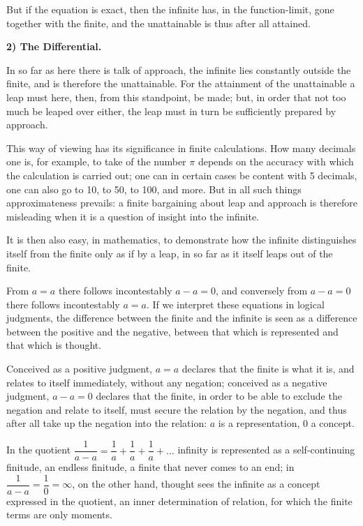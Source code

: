 \documentclass[12pt]{book}
\begin{document}
But if the equation is exact, then the infinite has, in the function-limit, gone
together with the finite, and the unattainable is thus after all attained.

\begin{center}
\textbf{2) The Differential.}
\end{center}
{}

In so far as here there is talk of approach, the infinite lies constantly outside the
finite, and is therefore
the unattainable. For the attainment of the unattainable a leap must here, then, from
this standpoint, be made; but, in order that not too much be leaped over either, the
leap must in turn be sufficiently prepared by approach.

This way of viewing has its significance in finite calculations. How many decimals
one is, for example, to take of the number $\pi$ depends on the accuracy with which
the calculation is carried out; one can in certain cases be content with 5 decimals,
one can also go to 10, to 50, to 100, and more. But in all such things
approximateness prevails: a finite bargaining about leap and approach is therefore
misleading when it is a question of insight into the infinite.

It is then also easy, in mathematics, to demonstrate how the infinite distinguishes
itself from the finite only as if by a leap, in so far as it itself leaps out of the
finite.

From $a = a$ there follows incontestably $a - a = 0$, and conversely from $a - a = 0$
there follows incontestably $a = a$. If we interpret these equations in logical
judgments, the difference between the finite and the infinite is seen as a difference
between the positive and the negative, between that which is represented and that
which is thought.

Conceived as a positive judgment, $a = a$ declares that the finite is what it is, and
relates to itself immediately, without any negation; conceived as a negative
judgment, $a - a = 0$ declares that the finite, in order to be able to exclude the
negation and relate to itself, must secure the relation by the negation, and thus
after all take up the negation into the relation: $a$ is a representation, $0$ a
concept.

In the quotient $\dfrac{1}{a-a} = \dfrac{1}{a} + \dfrac{1}{a} + \dfrac{1}{a} + \dots$
infinity is represented as a self-continuing finitude, an endless finitude, a finite
that never comes to an end; in $\dfrac{1}{a-a} = \dfrac{1}{0} = \infty$, on the other
hand, thought sees the
infinite as a concept expressed in the quotient, an inner determination of relation,
for which the finite terms are only moments.
\end{document}
